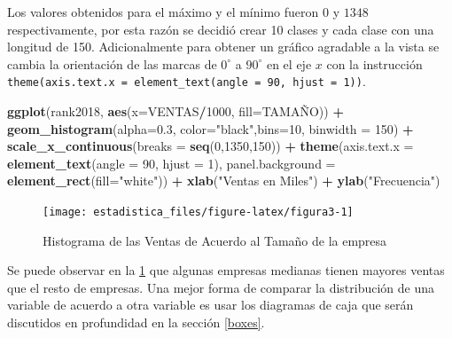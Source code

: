 \documentclass[]{book}
\newenvironment{Shaded}{\begin{snugshade}}{\end{snugshade}}
\newcommand{\DataTypeTok}[1]{\textcolor[rgb]{0.13,0.29,0.53}{#1}}
\newcommand{\DecValTok}[1]{\textcolor[rgb]{0.00,0.00,0.81}{#1}}
\newcommand{\FloatTok}[1]{\textcolor[rgb]{0.00,0.00,0.81}{#1}}
\newcommand{\KeywordTok}[1]{\textcolor[rgb]{0.13,0.29,0.53}{\textbf{#1}}}
\newcommand{\NormalTok}[1]{#1}
\newcommand{\OperatorTok}[1]{\textcolor[rgb]{0.81,0.36,0.00}{\textbf{#1}}}
\newcommand{\StringTok}[1]{\textcolor[rgb]{0.31,0.60,0.02}{#1}}
\begin{document}
Los valores obtenidos para el máximo y el mínimo fueron \(0\) y \(1348\) respectivamente, por esta razón se decidió crear 10 clases y cada clase con una longitud de 150. Adicionalmente para obtener un gráfico agradable a la vista se cambia la orientación de las marcas de \(0^\circ\) a \(90^\circ\) en el eje \(x\) con la instrucción \texttt{theme(axis.text.x\ =\ element\_text(angle\ =\ 90,\ hjust\ =\ 1))}.

\begin{Shaded}
\begin{Highlighting}[]
\KeywordTok{ggplot}\NormalTok{(rank2018, }\KeywordTok{aes}\NormalTok{(}\DataTypeTok{x=}\NormalTok{VENTAS}\OperatorTok{/}\DecValTok{1000}\NormalTok{, }\DataTypeTok{fill=}\NormalTok{TAMAÑO)) }\OperatorTok{+}\StringTok{ }
\StringTok{  }\KeywordTok{geom_histogram}\NormalTok{(}\DataTypeTok{alpha=}\FloatTok{0.3}\NormalTok{, }\DataTypeTok{color=}\StringTok{"black"}\NormalTok{,}\DataTypeTok{bins=}\DecValTok{10}\NormalTok{, }\DataTypeTok{binwidth =} \DecValTok{150}\NormalTok{) }\OperatorTok{+}
\StringTok{  }\KeywordTok{scale_x_continuous}\NormalTok{(}\DataTypeTok{breaks =} \KeywordTok{seq}\NormalTok{(}\DecValTok{0}\NormalTok{,}\DecValTok{1350}\NormalTok{,}\DecValTok{150}\NormalTok{)) }\OperatorTok{+}
\StringTok{  }\KeywordTok{theme}\NormalTok{(}\DataTypeTok{axis.text.x =} \KeywordTok{element_text}\NormalTok{(}\DataTypeTok{angle =} \DecValTok{90}\NormalTok{, }\DataTypeTok{hjust =} \DecValTok{1}\NormalTok{), }\DataTypeTok{panel.background =} \KeywordTok{element_rect}\NormalTok{(}\DataTypeTok{fill=}\StringTok{"white"}\NormalTok{)) }\OperatorTok{+}
\StringTok{  }\KeywordTok{xlab}\NormalTok{(}\StringTok{"Ventas en Miles"}\NormalTok{) }\OperatorTok{+}\StringTok{ }\KeywordTok{ylab}\NormalTok{(}\StringTok{"Frecuencia"}\NormalTok{) }
\end{Highlighting}
\end{Shaded}

\begin{figure}[h!]

{\centering \texttt{[image: estadistica\_files/figure-latex/figura3-1]} 

}

\caption{Histograma de las Ventas de Acuerdo al Tamaño de la empresa}\label{fig:figura3}
\end{figure}

Se puede observar en la \ref{fig:figura3} que algunas empresas medianas tienen mayores ventas que el resto de empresas. Una mejor forma de comparar la distribución de una variable de acuerdo a otra variable es usar los diagramas de caja que serán discutidos en profundidad en la sección \ref{boxes}.
\end{document}
